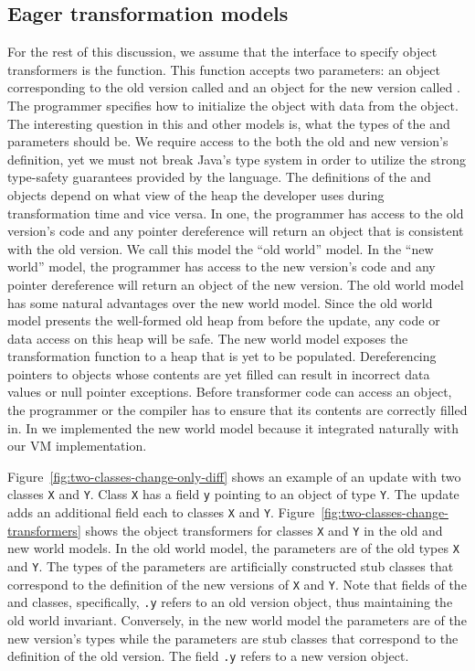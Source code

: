 \subsection{Eager transformation models}

For the rest of this discussion, we assume that the interface to specify
object transformers is the \JO function. This function accepts two
parameters: an object corresponding to the old version called \FROM and an
object for the new version called \TO. The programmer specifies how to
initialize the \TO object with data from the \FROM object.  The
interesting question in this and other models is,
what the types of the \FROM and \TO parameters
should be. We require access to the both the old and new version's
definition, yet we must not break Java's type system in order to utilize
the strong type-safety guarantees provided by the language. The definitions
of the \FROM and \TO objects depend on what view of the heap
the developer uses during transformation time and vice versa. In one, the
programmer has access to the old version's code and any pointer dereference
will return an object that is consistent with the old version.  We call
this model the ``old world'' model. In the ``new world'' model, the programmer has access to
the new version's code and any pointer dereference will return an object of
the new version. The old world model
has some natural advantages over the new world model. Since the old world
model presents the well-formed old heap from before the update, any code or
data access on this heap will be safe. The new world model exposes the
transformation function to a heap that is yet to be populated.  Dereferencing
pointers to objects whose contents are yet filled can result in
incorrect data values or null pointer exceptions. Before transformer
code can access an object, the programmer or the compiler has to ensure
that its contents are correctly filled in. In \JV we implemented the new
world model because it integrated naturally with our VM implementation.


% 

Figure~\ref{fig:two-classes-change-only-diff} shows an example of an update
with two classes {\tt X} and {\tt Y}.  Class {\tt X} has a field {\tt y}
pointing to an object of type {\tt Y}.  The update adds an additional field
each to classes {\tt X} and {\tt Y}.
Figure~\ref{fig:two-classes-change-transformers} shows the object
transformers for classes {\tt X} and {\tt Y} in the old and new world
models. In the old world model, the \FROM parameters are of the old types
{\tt X} and {\tt Y}. The types of the \TO parameters are artificially
constructed stub classes that correspond to the definition of the new
versions of {\tt X} and {\tt Y}. Note that fields of the \nX and \nY
classes, specifically, {\tt \nX.y} refers to an old version object, thus
maintaining the old world invariant. Conversely, in the new world model the \TO
parameters are of the new version's types while the \FROM parameters are
stub classes that correspond to the definition of the old version. The
field {\tt \oX.y} refers to a new version object.

